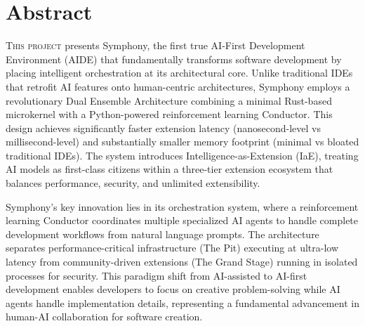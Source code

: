 
\section{Abstract}
\label{sec:abstract}

\lettrine{T}{his project} presents Symphony, the first true AI-First Development Environment (AIDE) that fundamentally transforms software development by placing intelligent orchestration at its architectural core. Unlike traditional IDEs that retrofit AI features onto human-centric architectures, Symphony employs a revolutionary Dual Ensemble Architecture combining a minimal Rust-based microkernel with a Python-powered reinforcement learning Conductor. This design achieves significantly faster extension latency (nanosecond-level vs millisecond-level) and substantially smaller memory footprint (minimal vs bloated traditional IDEs). The system introduces Intelligence-as-Extension (IaE), treating AI models as first-class citizens within a three-tier extension ecosystem that balances performance, security, and unlimited extensibility.

Symphony's key innovation lies in its orchestration system, where a reinforcement learning Conductor coordinates multiple specialized AI agents to handle complete development workflows from natural language prompts. The architecture separates performance-critical infrastructure (The Pit) executing at ultra-low latency from community-driven extensions (The Grand Stage) running in isolated processes for security. This paradigm shift from AI-assisted to AI-first development enables developers to focus on creative problem-solving while AI agents handle implementation details, representing a fundamental advancement in human-AI collaboration for software creation.

\clearpage
